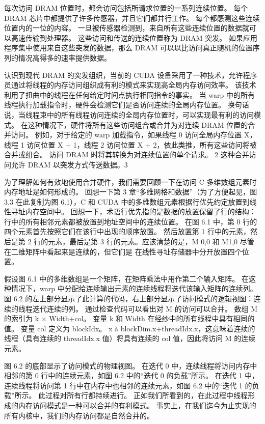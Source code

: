 每次访问 DRAM 位置时，都会访问包括所请求位置的一系列连续位置。 每个 DRAM 芯片中都提供了许多传感器，并且它们都并行工作。 每个都感测这些连续位置内的一位的内容。 一旦被传感器检测到，来自所有这些连续位置的数据就可以高速传输到处理器。 这些访问和传送的连续位置称为 DRAM 突发。 如果应用程序集中使用来自这些突发的数据，那么 DRAM 可以以比访问真正随机的位置序列的情况高得多的速率提供数据。

认识到现代 DRAM 的突发组织，当前的 CUDA 设备采用了一种技术，允许程序员通过将线程的内存访问组织成有利的模式来实现高全局内存访问效率。 该技术利用了扭曲中的线程在任何给定时间点执行相同指令的事实。 当 warp 中的所有线程执行加载指令时，硬件会检测它们是否访问连续的全局内存位置。 换句话说，当线程束中的所有线程访问连续的全局内存位置时，可以实现最有利的访问模式。 在这种情况下，硬件将所有这些访问组合或合并为对连续 DRAM 位置的合并访问。 例如，对于给定的 warp 加载指令，如果线程 0 访问全局内存位置 X，线程 1 访问位置 X + 1，线程 2 访问位置 X + 2，依此类推，所有这些访问将被合并或组合。 访问 DRAM 时将其转换为对连续位置的单个请求。 2 这种合并访问允许 DRAM 以突发方式传送数据。3

为了理解如何有效地使用合并硬件，我们需要回顾一下在访问 C 多维数组元素时内存地址是如何形成的。 回想一下第 3 章“多维网格和数据”（为了方便起见，图 3.3 在此复制为图 6.1），C 和 CUDA 中的多维数组元素根据行优先约定放置到线性寻址内存空间中。 回想一下，术语行优先指的是数据的放置保留了行的结构：行中的所有相邻元素都被放置到地址空间中的连续位置。 在图 6.1 中，第 0 行的四个元素首先按照它们在该行中出现的顺序放置。 然后放置第 1 行中的元素，然后是第 2 行的元素，最后是第 3 行的元素。应该清楚的是，M 0,0 和 M1,0 尽管在二维矩阵中看起来是连续的，但它们是 在线性寻址存储器中分开放置四个位置。

假设图 6.1 中的多维数组是一个矩阵，在矩阵乘法中用作第二个输入矩阵。 在这种情况下，warp 中分配给连续输出元素的连续线程将迭代该输入矩阵的连续列。 图 6.2 的左上部分显示了此计算的代码，右上部分显示了访问模式的逻辑视图：连续的线程迭代连续的列。 通过检查代码可以看出对 M 的访问可以合并。 数组 M 的索引为 k × Width+col。 变量 k 和 Width 在经纱中的所有线程中具有相同的值。 变量 col 定义为 blockIdx。 x à blockDim.x+threadIdx.x，这意味着连续的线程（具有连续的 threadIdx.x 值）将具有连续的 col 值，因此将访问 M 的连续元素。

图 6.2 的底部显示了访问模式的物理视图。 在迭代 0 中，连续线程将访问内存中相邻的第 0 行中的连续元素，如图 6.2 中的“迭代 0 的负载”所示。 在迭代 1 中，连续线程将访问第 1 行中在内存中也相邻的连续元素，如图 6.2 中的“迭代 1 的负载”所示。 此过程对所有行都持续进行。 正如我们所看到的，在此过程中线程形成的内存访问模式是一种可以合并的有利模式。 事实上，在我们迄今为止实现的所有内核中，我们的内存访问都是自然合并的。

